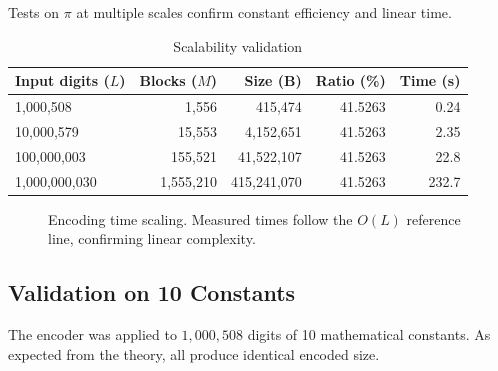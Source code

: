 \documentclass[10pt, onecolumn]{IEEEtran}
\begin{document}
Tests on $\pi$ at multiple scales confirm constant efficiency and linear time.

\begin{table}[ht]
\centering
\caption{Scalability validation}
\label{tab:pi_scale}
\begin{tabular}{lrrrr}
\toprule
Input digits ($L$) & Blocks ($M$) & Size (B) & Ratio (\%) & Time (s) \\
\midrule
1,000,508 & 1,556 & 415,474 & 41.5263 & 0.24 \\
10,000,579 & 15,553 & 4,152,651 & 41.5263 & 2.35 \\
100,000,003 & 155,521 & 41,522,107 & 41.5263 & 22.8 \\
1,000,000,030 & 1,555,210 & 415,241,070 & 41.5263 & 232.7 \\
\bottomrule
\end{tabular}
\end{table}

\begin{figure}[ht]
\centering
{}
\caption{Encoding time scaling. Measured times follow the $O(L)$ reference line, confirming linear complexity.}
\label{fig:scalability}
\end{figure}

\subsection{Validation on 10 Constants}

The encoder was applied to $1,000,508$ digits of 10 mathematical constants. As expected from the theory, all produce identical encoded size.
\end{document}
